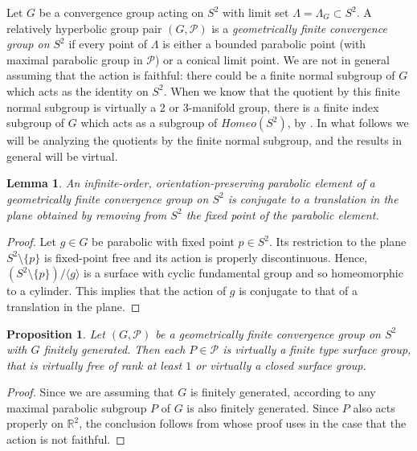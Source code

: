 \documentclass[11pt]{article}
\newtheorem{lemma}[theorem]{Lemma}
\newtheorem{proposition}[theorem]{Proposition}
\theoremstyle{definition}
\newcommand\PP{\mathcal{P}}
\begin{document}
Let $G$ be a convergence group acting on $S^2$ with limit set $\Lambda=\Lambda_G\subset S^2$. A relatively hyperbolic group pair $(G,\PP)$ is a {\it geometrically finite convergence group on $S^2$} if every point of $\Lambda$ is either a bounded parabolic point (with maximal parabolic group in $\PP$) or a conical limit point.  
We are not in general assuming that the action is faithful: there could be a finite normal subgroup of $G$  which acts as the identity on $S^2$.  When we know that the quotient by this finite normal subgroup is virtually a 2 or 3-manifold group, there is a finite index subgroup of $G$ which acts  as a subgroup of $Homeo(S^2)$, by \cite[Theorem 1.3]{peter:cyril}.  In what follows we will be analyzing the quotients by the finite normal subgroup, and the results in general will be virtual. 


\begin{lemma}\label{lma:translation} An infinite-order, orientation-preserving parabolic element of a geometrically finite convergence group on $S^2$ is conjugate to a translation {in the plane obtained by removing from $S^2$ the fixed point of the parabolic element}.
\end{lemma}



\begin{proof} Let $g\in G$ be parabolic with fixed point $p\in S^2$. Its restriction to the plane $S^2\setminus \{p\}$ is fixed-point
free and its action is properly discontinuous. Hence, $(S^2\setminus\{p\})/\langle g\rangle $ is a surface with cyclic  
fundamental group and so homeomorphic to a cylinder. This implies that the action of $g$ is conjugate to that
of a translation in the plane. \end{proof}

\begin{proposition}\label{prop:planarparabolics} 
 Let {$(G, \mathcal{P})$} be a geometrically finite convergence group on $S^2$ with $G$ finitely generated. Then each $P \in \PP$ is virtually a finite type surface group, that is virtually free of rank at least $1$ or virtually a closed surface group.
\end{proposition}

\begin{proof}
{Since we are assuming that $G$ is finitely generated, according to \cite[Prop.~2.29]{Osin06} any maximal parabolic subgroup $P$ of $G$ is also finitely generated.}
Since $P$ also acts properly on $\mathbb{R}^2$, {the conclusion follows from} 
\cite[Cor. 3.2]{hruska:walsh}  {whose } 
proof uses \cite[Thm 1.3]{peter:cyril} in the case that {the action is not faithful.} 
\end{proof} 
\end{document}
